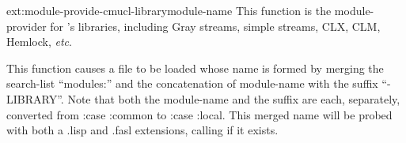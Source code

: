 \begin{defun}{ext:}{module-provide-cmucl-library}{module-name}
  This function is the module-provider for \cmucl's libraries,
  including Gray streams, simple streams, CLX, CLM, Hemlock,
  \emph{etc}.
  
  This function causes a file to be loaded whose name is formed by
  merging the search-list ``modules:'' and the concatenation of
  module-name with the suffix ``-LIBRARY''.  Note that both the
  module-name and the suffix are each, separately, converted from
  :case :common to :case :local.  This merged name will be probed with
  both a .lisp and .fasl extensions, calling  if it exists.
\end{defun}
